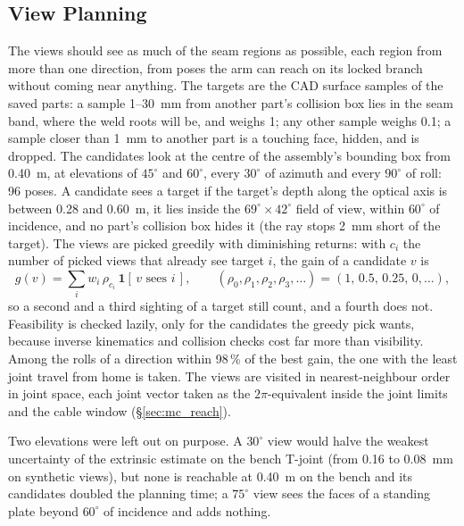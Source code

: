 \subsection{View Planning}
\label{sec:mv_views}
The views should see as much of the seam regions as possible, each region from more than one
direction, from poses the arm can reach on its locked branch without coming near anything. The
targets are the CAD surface samples of the saved parts: a sample 1--30~mm from another part's
collision box lies in the seam band, where the weld roots will be, and weighs 1; any other sample weighs 0.1; a sample
closer than 1~mm to another part is a touching face, hidden, and is dropped. The candidates look at
the centre of the assembly's bounding box from 0.40~m, at elevations of $45^\circ$ and $60^\circ$,
every $30^\circ$ of azimuth and every $90^\circ$ of roll: 96 poses. A candidate sees a target if the
target's depth along the optical axis is between 0.28 and 0.60~m, it lies inside the
$69^\circ\times42^\circ$ field of view, within $60^\circ$ of incidence, and no part's collision box
hides it (the ray stops 2~mm short of the target). The views are picked greedily
with diminishing returns: with $c_i$ the number of picked views that already see target $i$, the
gain of a candidate $v$ is
\begin{equation}
g(v)=\sum_i w_i\,\rho_{c_i}\,\mathbf{1}[\,v\text{ sees }i\,],\qquad
(\rho_0,\rho_1,\rho_2,\rho_3,\dots)=(1,\,0.5,\,0.25,\,0,\dots),
\label{eq:view_gain}
\end{equation}
so a second and a third sighting of a target still count, and a fourth does not. Feasibility is
checked lazily, only for the candidates the greedy pick wants, because inverse kinematics and
collision checks cost far more than visibility. Among the rolls of a direction within 98\,\% of the
best gain, the one with the least joint travel from home is taken. The views are visited in
nearest-neighbour order in joint space, each joint vector taken as the $2\pi$-equivalent inside the
joint limits and the cable window (\S\ref{sec:mc_reach}).

Two elevations were left out on purpose. A $30^\circ$ view would halve the weakest uncertainty of
the extrinsic estimate on the bench T-joint (from 0.16 to 0.08~mm on synthetic views), but none is
reachable at 0.40~m on the bench and its candidates doubled the
planning time; a $75^\circ$ view sees the faces of a standing plate beyond $60^\circ$ of incidence and
adds nothing.

